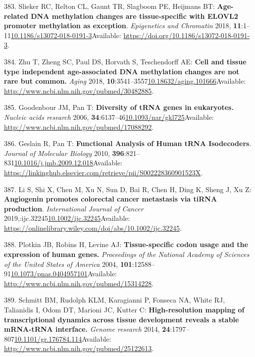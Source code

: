 \documentclass[
]{book}
\begin{document}
\leavevmode\hypertarget{ref-Slieker2018}{}%
383. Slieker RC, Relton CL, Gaunt TR, Slagboom PE, Heijmans BT: \textbf{Age-related DNA methylation changes are tissue-specific with ELOVL2 promoter methylation as exception}. \emph{Epigenetics and Chromatin} 2018, \textbf{11}:1--11\href{https://doi.org/10.1186/s13072-018-0191-3}{10.1186/s13072-018-0191-3}Available: \url{https://doi.org/10.1186/s13072-018-0191-3}.

\leavevmode\hypertarget{ref-Zhu2018}{}%
384. Zhu T, Zheng SC, Paul DS, Horvath S, Teschendorff AE: \textbf{Cell and tissue type independent age-associated DNA methylation changes are not rare but common.} \emph{Aging} 2018, \textbf{10}:3541--3557\href{https://doi.org/10.18632/aging.101666}{10.18632/aging.101666}Available: \url{http://www.ncbi.nlm.nih.gov/pubmed/30482885}.

\leavevmode\hypertarget{ref-Goodenbour2006}{}%
385. Goodenbour JM, Pan T: \textbf{Diversity of tRNA genes in eukaryotes.} \emph{Nucleic acids research} 2006, \textbf{34}:6137--46\href{https://doi.org/10.1093/nar/gkl725}{10.1093/nar/gkl725}Available: \url{http://www.ncbi.nlm.nih.gov/pubmed/17088292}.

\leavevmode\hypertarget{ref-Geslain2010}{}%
386. Geslain R, Pan T: \textbf{Functional Analysis of Human tRNA Isodecoders}. \emph{Journal of Molecular Biology} 2010, \textbf{396}:821--831\href{https://doi.org/10.1016/j.jmb.2009.12.018}{10.1016/j.jmb.2009.12.018}Available: \url{https://linkinghub.elsevier.com/retrieve/pii/S002228360901523X}.

\leavevmode\hypertarget{ref-Li2019}{}%
387. Li S, Shi X, Chen M, Xu N, Sun D, Bai R, Chen H, Ding K, Sheng J, Xu Z: \textbf{Angiogenin promotes colorectal cancer metastasis via tiRNA production}. \emph{International Journal of Cancer} 2019,:ijc.32245\href{https://doi.org/10.1002/ijc.32245}{10.1002/ijc.32245}Available: \url{https://onlinelibrary.wiley.com/doi/abs/10.1002/ijc.32245}.

\leavevmode\hypertarget{ref-Plotkin2004}{}%
388. Plotkin JB, Robins H, Levine AJ: \textbf{Tissue-specific codon usage and the expression of human genes.} \emph{Proceedings of the National Academy of Sciences of the United States of America} 2004, \textbf{101}:12588--91\href{https://doi.org/10.1073/pnas.0404957101}{10.1073/pnas.0404957101}Available: \url{http://www.ncbi.nlm.nih.gov/pubmed/15314228}.

\leavevmode\hypertarget{ref-Schmitt2014}{}%
389. Schmitt BM, Rudolph KLM, Karagianni P, Fonseca NA, White RJ, Talianidis I, Odom DT, Marioni JC, Kutter C: \textbf{High-resolution mapping of transcriptional dynamics across tissue development reveals a stable mRNA-tRNA interface.} \emph{Genome research} 2014, \textbf{24}:1797--807\href{https://doi.org/10.1101/gr.176784.114}{10.1101/gr.176784.114}Available: \url{http://www.ncbi.nlm.nih.gov/pubmed/25122613}.
\end{document}
